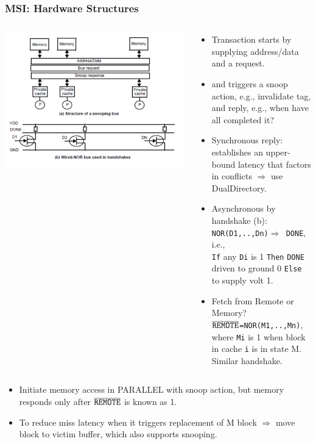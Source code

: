 \documentclass{beamer}
\newcommand{\emp}[1]{\textcolor{DikuRed}{ #1}}
\begin{document}
\begin{frame}[fragile,t]
\frametitle{MSI: Hardware Structures}

\begin{columns}\hspace{-5ex}
\includegraphics[width=47ex]{Figures/FigsInfCoherence/SnoopingBus}
\vspace{-3ex}
\begin{scriptsize}
\begin{itemize}
    \item Transaction starts by supplying \emp{address/data} and a \emp{request}.
    \item and triggers a \emp{snoop action}, e.g., invalidate tag, and \emp{reply},
            e.g., when have all completed it?
    \item \emp{Synchronous} reply: establishes an upper-bound latency that 
            factors in conflicts $\Rightarrow$ use DualDirectory. 
    \item \emp{Asynchronous} by handshake (b):\\{{\tt NOR(D1,..,Dn)$\Rightarrow$ DONE}}, i.e.,\\
            {\tt If} any {\tt Di} is 1 {\tt Then} {\tt DONE} driven to ground 0
            {\tt Else} to supply volt 1. 
    \item \emp{Fetch from Remote or Memory?}\\
            $\overline{\mbox{\tt REMOTE}}${\tt=NOR(M1,..,Mn)}, where {\tt Mi} 
            is 1 when block in cache {\tt i} is in state M. Similar handshake.
\end{itemize}
\end{scriptsize}
\end{columns}

\begin{itemize}
    \item Initiate memory access in PARALLEL with snoop action, but memory responds 
        only after $\overline{\mbox{\tt REMOTE}}$ is known as 1.
    \item To reduce miss latency when it triggers replacement of M block $\Rightarrow$
            move block to \emp{victim buffer, which also supports snooping}.
\end{itemize} 

\end{frame}
\end{document}
